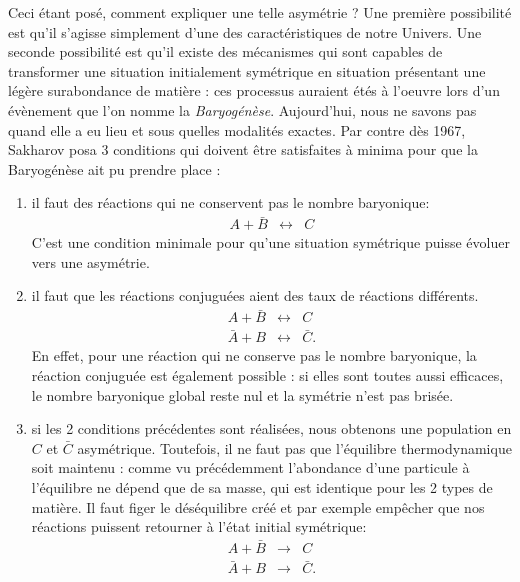 Ceci étant posé, comment expliquer une telle asymétrie ? Une première possibilité est qu'il s'agisse simplement d'une des caractéristiques de notre Univers. Une seconde possibilité est qu'il existe des mécanismes qui sont capables de transformer une situation initialement symétrique en situation présentant une légère surabondance de matière : ces processus auraient étés à l'oeuvre lors d'un évènement que l'on nomme la \textit{Baryogénèse}. Aujourd'hui, nous ne savons pas quand elle a eu lieu et sous quelles modalités exactes. Par contre dès 1967, Sakharov posa 3 conditions qui doivent être satisfaites à minima pour que la Baryogénèse ait pu prendre place :
\begin{enumerate}
\item il faut des réactions qui ne conservent pas le nombre baryonique:
\begin{eqnarray}
A + \bar B &\leftrightarrow& C
\end{eqnarray}
C'est une condition minimale pour qu'une situation symétrique puisse évoluer vers une asymétrie.
\item il faut que les réactions conjuguées aient des taux de réactions différents.
\begin{eqnarray}
A + \bar B &\leftrightarrow& C\\
\bar A + B &\leftrightarrow& \bar C.
\end{eqnarray}
En effet, pour une réaction qui ne conserve pas le nombre baryonique, la réaction conjuguée est également possible : si elles sont toutes aussi efficaces, le nombre baryonique global reste nul et la symétrie n'est pas brisée.
\item si les 2 conditions précédentes sont réalisées, nous obtenons une population en $C$ et $\bar C$ asymétrique. Toutefois, il ne faut pas que l'équilibre thermodynamique soit maintenu : comme vu précédemment l'abondance d'une particule à l'équilibre ne dépend que de sa masse, qui est identique pour les 2 types de matière. Il faut figer le déséquilibre créé et par exemple empêcher que nos réactions puissent retourner à l'état initial symétrique:
\begin{eqnarray}
A + \bar B &\rightarrow& C\\
\bar A + B &\rightarrow& \bar C.
\end{eqnarray}
\end{enumerate}
